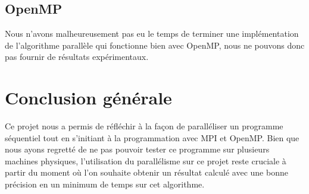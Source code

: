 \documentclass[a4paper,10pt]{article}
\begin{document}
\subsection{OpenMP}
Nous n'avons malheureusement pas eu le temps de terminer une implémentation de l'algorithme parallèle qui fonctionne bien avec OpenMP,  nous ne pouvons donc pas fournir de résultats expérimentaux.


\newpage
\section{Conclusion générale}
Ce projet nous a permis de réfléchir à la façon de paralléliser un programme séquentiel tout en s'initiant à la programmation avec MPI et OpenMP. 
Bien que nous ayons regretté de ne pas pouvoir tester ce programme 
sur plusieurs machines physiques, l'utilisation du parallélisme sur ce projet 
reste cruciale à partir du moment où l'on souhaite obtenir un résultat calculé
avec une bonne précision en un minimum de temps sur cet algorithme. 
\end{document}
